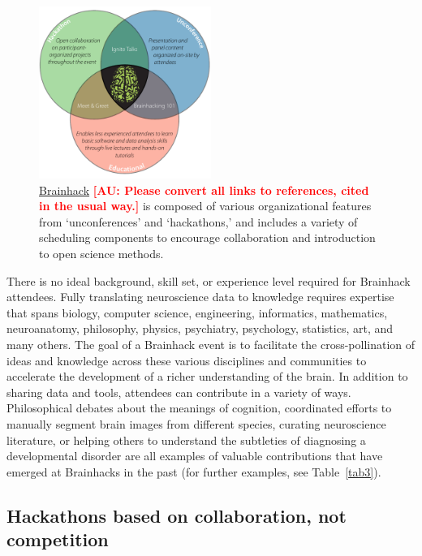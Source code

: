 \documentclass[11pt]{bmc_article_s50}
\begin{document}
\begin{figure}[htp]
\begin{center}
  \includegraphics[width=0.5\textwidth]{Figure_01}
  \caption{\href{http://www.brainhack.org}{Brainhack} {\textbf{\textcolor{red}{[AU: Please convert all links to references, cited in the usual way.]}}} is composed of various organizational features from `unconferences' and `hackathons,' and includes a variety of scheduling components to encourage collaboration and introduction to open science methods.}
  \label{fig1}
\end{center}
\end{figure}

There is no ideal background, skill set, or experience level required for Brainhack attendees. Fully translating neuroscience data to knowledge requires expertise that spans %
 biology, computer science, engineering, informatics, mathematics, neuroanatomy, philosophy, physics, psychiatry, psychology, statistics, art, and many others. The goal of a Brainhack event is to facilitate the cross-pollination of ideas and knowledge across these various disciplines and communities to accelerate the development of a richer understanding of the brain. In addition to sharing data and tools, attendees can contribute in a variety of ways. Philosophical debates about the meanings of cognition, coordinated efforts to manually segment brain images from different species, curating neuroscience literature, or helping others to understand the subtleties of diagnosing a developmental disorder are all examples of valuable contributions that have emerged at Brainhacks in the past (for further examples, see Table~\ref{tab3}).

\subsection*{Hackathons based on collaboration, not competition}
\end{document}
